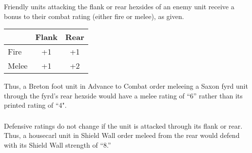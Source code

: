 \subsubsection[Flank or Rear]{} Friendly units attacking the flank or rear hexsides of an enemy unit receive a bonus to their combat rating (either fire or melee), as given.

\begin{tabular}{ lcc }
  & \textbf{Flank} & \textbf{Rear} \\
  \hline
  Fire & +1 & +1 \\
  Melee & +1 & +2 \\
\end{tabular}

Thus, a Breton foot unit in Advance to Combat order meleeing a Saxon fyrd unit through the fyrd's rear hexside would have a melee rating of “6” rather than its printed rating of “4".

\subsubsection[Defensive Ratings]{} Defensive ratings do not change if the unit is attacked through its flank or rear. Thus, a housecarl unit in Shield Wall order meleed from the rear would defend with its Shield Wall strength of “8.”

